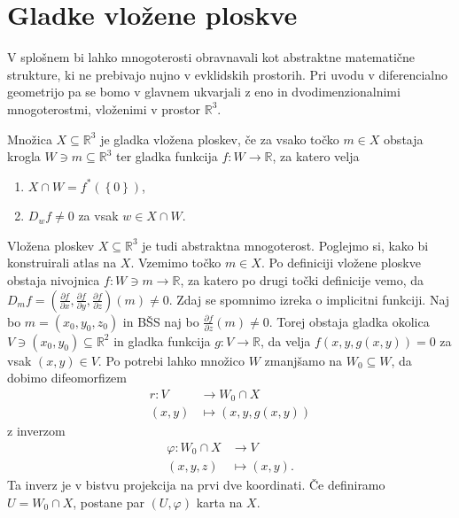 \section{Gladke vložene ploskve}%
\label{sec:Gladke_vložene_ploskve}

V splošnem bi lahko mnogoterosti obravnavali kot abstraktne
matematične strukture, ki ne prebivajo nujno v evklidskih
prostorih. Pri uvodu v diferencialno geometrijo pa se bomo v
glavnem ukvarjali z eno in dvodimenzionalnimi mnogoterostmi,
vloženimi v prostor $\mathbb{R}^3$. 

\begin{definicija}
\label{def_gladka_vložena_ploskev} Množica
$X \subseteq \mathbb{R}^3$ je gladka vložena ploskev, če
za vsako točko $m \in  X$ obstaja krogla $W \ni m \subseteq
\mathbb{R}^3$ ter gladka funkcija $f : W \to \mathbb{R}$,
za katero velja 
\begin{enumerate} \item $X \cap W =
f^{*}\left( \left\{ 0\right\}  \right)$,
\item $D_wf \neq 0 $ za vsak $w \in X \cap  W$. 
\end{enumerate}    
\end{definicija}

Vložena ploskev $X \subseteq  \mathbb{R}^3$ je tudi abstraktna
mnogoterost. Poglejmo si, kako bi konstruirali atlas na $X$.
Vzemimo točko $m \in  X$. Po definiciji vložene ploskve
obstaja nivojnica $f: W \ni m \to \mathbb{R}$, za katero po drugi točki definicije vemo, da
$D_mf = \left( \frac{ \partial f }{ \partial x } , \frac{
\partial f }{ \partial y }  , \frac{ \partial f }{ \partial z
} \right)\left( m \right) \neq 0$. Zdaj se spomnimo izreka o
implicitni funkciji. Naj bo $m = \left( x_0, y_0 , z_0 \right)$ in
BŠS naj bo $\frac{ \partial f }{ \partial z }\left( m \right) \neq
0$. Torej obstaja gladka okolica $V \ni \left( x_0, y_0 \right)
\subseteq \mathbb{R}^2$  in gladka funkcija $g: V \to \mathbb{R}$,
da velja $f\left( x, y, g\left( x,y \right) \right) = 0$  za vsak
$\left( x,y \right) \in  V$. Po potrebi lahko množico $W$
zmanjšamo na $W_0 \subseteq  W$, da dobimo difeomorfizem
\begin{align*} r: V &\longrightarrow W_0 \cap  X \\ \left( x,y
\right) &\longmapsto \left( x,y,g\left( x,y \right) \right)
\end{align*} z inverzom \begin{align*} \varphi: W_0 \cap X
&\longrightarrow V \\ \left( x,y,z \right)
&\longmapsto \left( x,y \right). \end{align*}Ta inverz
je v bistvu projekcija na prvi dve koordinati. Če
definiramo $U = W_0 \cap  X$, postane par $\left( U,
\varphi \right)$ karta na $X$.  

